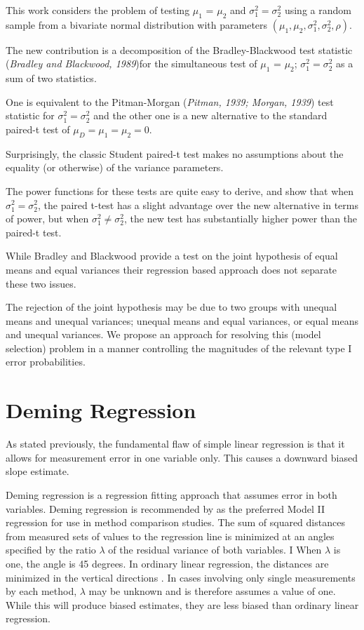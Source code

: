 \documentclass[12pt, a4paper]{report}
\theoremstyle{plain}
\theoremstyle{definition}
\theoremstyle{remark}
\begin{document}
	This work considers the problem of testing $\mu_1$ = $\mu_2$ and $\sigma^2_1 = \sigma^2_2$ using a random sample from a bivariate normal distribution with parameters $(\mu_1, \mu_2, \sigma^2_1, \sigma^2_2, \rho)$. 
	
	The new contribution is a decomposition of the Bradley-Blackwood test statistic (\textit{Bradley and Blackwood, 1989})for the simultaneous test of {$\mu_1$ = $\mu_2$; $\sigma^2_1 = \sigma^2_2$}  as a sum of two statistics. 
	
	One is equivalent to the Pitman-Morgan (\textit{Pitman, 1939; Morgan, 1939}) test statistic 
	for $\sigma^2_1 = \sigma^2_2$ and the other one is a new alternative to the standard paired-t test of $\mu_D = \mu_1 = \mu_2 = 0$. 
	
	Surprisingly, the classic Student paired-t test makes no assumptions about the equality (or otherwise) of the 
	variance parameters. 
	
	The power functions for these tests are quite easy to derive, and show that when $\sigma^2_1 = \sigma^2_2$, 
	the paired t-test has a slight advantage over the new alternative in terms of power, but when $\sigma^2_1 \neq \sigma^2_2$, the 
	new test has substantially higher power than the paired-t test.
	
	While Bradley and Blackwood provide a test on the joint hypothesis of equal means and equal variances their regression based approach does not separate these two issues.
	
	The rejection of the joint hypothesis may be 
	due to two groups with unequal means and unequal variances; unequal means and equal variances, or equal means and unequal variances. We propose an approach for resolving this (model selection) problem in a manner controlling the magnitudes of the relevant type I error probabilities.
	
	

	\section{Deming Regression}
	
	As stated previously, the fundamental flaw of simple linear regression is that it allows for measurement error in one variable only. This causes a downward biased slope estimate.
	
	Deming regression is a regression fitting approach that assumes error in both variables. Deming regression is recommended by \citet*{CornCoch} as the
	preferred Model II regression for use in method comparison studies.
	The sum of squared distances from measured sets of values to the regression line is minimized at an angles specified by the ratio $\lambda$ of the residual variance of both variables. I
	When $\lambda$ is one, the angle is 45 degrees. In ordinary linear regression, the distances are minimized in the vertical directions \citep{linnet99}.
	In cases involving only single measurements by each method, $\lambda$ may be unknown and is therefore assumes a value of one. While this will produce biased estimates, they are less biased than ordinary linear regression.
	
\end{document}
